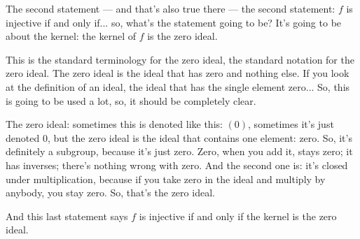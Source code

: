 \begin{speech}[00:23:08 - 00:24:34]
The second statement --- and that's also true there --- the second statement:  $f$ is injective if and only if...  so, what's the statement going to be? It's going to be about the kernel: the kernel of $f$ is the zero ideal. 

This is the standard terminology for the zero ideal, the standard notation for the zero ideal. The zero ideal is the ideal that has zero and nothing else. If you look at the definition of an ideal, the ideal that has the single element zero... So, this is going to be used a lot, so, it should be completely clear. 

The zero ideal: sometimes this is denoted like this: $(0)$, sometimes it's just denoted $0$, but the zero ideal is the ideal that contains one element: zero. So, it's definitely a subgroup, because it's just zero. Zero, when you add it, stays zero; it has inverses; there's nothing wrong with zero. And the second one is: it's closed under multiplication, because if you take zero in the ideal and multiply by anybody, you stay zero. So, that's the zero ideal. 

And this last statement says $f$ is injective if and only if the kernel is the zero ideal.
\end{speech}

\begin{content}

\end{content}

